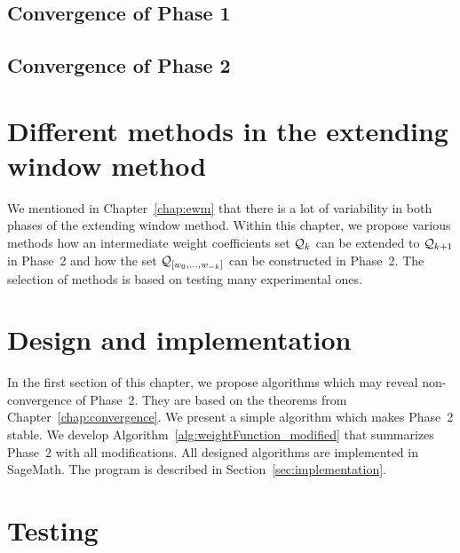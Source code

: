	\section{Convergence of Phase 1}
	

	\section{Convergence of Phase 2}
	
	

	


\chapter{Different methods in the extending window method}
	\label{chap:diffChoices}
	We mentioned in Chapter~\ref{chap:ewm} that there is a lot of variability in both phases of the extending window method. Within this chapter, we propose various methods how an intermediate weight coefficients set $\mathcal{Q}_k$ can be extended to $\mathcal{Q}_{k+1}$ in Phase~2 and how the set $\mathcal{Q}_{[w_{0}, \dots, w_{-k}]}$ can be constructed in Phase~2. The selection of methods is based on testing many experimental ones. 

	

	

	
	


\chapter{Design and implementation}

In the first section of this chapter, we propose algorithms which may reveal non-convergence of Phase~2. They are based on the theorems from Chapter~\ref{chap:convergence}. We present a simple algorithm which makes Phase~2 stable. We develop Algorithm~\ref{alg:weightFunction_modified} that summarizes  Phase~2 with all modifications. All designed algorithms are implemented in SageMath. The program is described in Section~\ref{sec:implementation}.
\label{chap:design}
	
	

\chapter{Testing}
\label{chap:testing}
	


\cleardoublepage{}
{}
